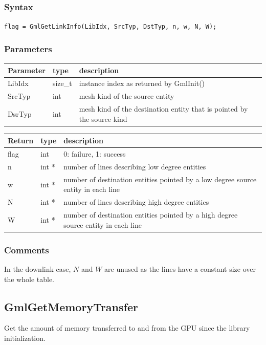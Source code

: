 \documentclass[a4paper,12pt]{article}
\begin{document}
\subsubsection*{Syntax}
{\tt flag = GmlGetLinkInfo(LibIdx, SrcTyp, DstTyp, n, w, N, W);}

\subsubsection*{Parameters}
\begin{tabular}{|m{2cm}|m{1.5cm}|m{10.5cm}|}
\hline
Parameter  & type    & description \\
\hline
LibIdx     & size\_t & instance index as returned by GmlInit() \\
\hline
SrcTyp     & int     & mesh kind of the source entity \\
\hline
DsrTyp     & int     & mesh kind of the destination entity that is pointed by the source kind \\
\hline
\end{tabular}

\medskip

\begin{tabular}{|m{2cm}|m{1.5cm}|m{10.5cm}|}
\hline
Return     & type   & description \\
\hline
flag       & int    & 0: failure, 1: success \\
\hline
n          & int *  & number of lines describing low degree entities \\
\hline
w          & int *  & number of destination entities pointed by a low degree source entity in each line \\
\hline
N          & int *  & number of lines describing high degree entities \\
\hline
W          & int *  & number of destination entities pointed by a high degree source entity in each line \\
\hline
\end{tabular}

\subsubsection*{Comments}
In the downlink case, $N$ and $W$ are unused as the lines have a constant size over the whole table.


\subsection{GmlGetMemoryTransfer}
Get the amount of memory transferred to and from the GPU since the library initialization.
\end{document}
